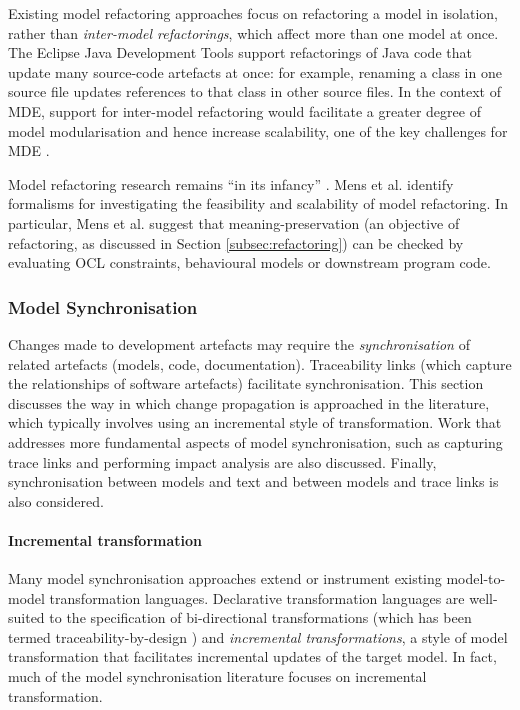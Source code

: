  
Existing model refactoring approaches focus on refactoring a model in isolation, rather than \emph{inter-model refactorings}, which affect more than one model at once. The Eclipse Java Development Tools support refactorings of Java code that update many source-code artefacts at once: for example, renaming a class in one source file updates references to that class in other source files. In \cc the context of MDE, support for inter-model refactoring would facilitate a greater degree of model modularisation and hence increase scalability, one of the key challenges for MDE \cite{kolovos08scalability}.

Model \cc refactoring research remains ``in its infancy'' \cite{mens07modelrefactoring}. Mens et al. identify formalisms for investigating the feasibility and scalability of model refactoring. In particular, Mens et al. suggest that meaning-preservation (an objective of refactoring, as discussed in Section \ref{subsec:refactoring}) can be checked by evaluating OCL constraints, behavioural models or downstream program code.


\subsubsection{Model Synchronisation}
\label{subsubsec:model_synch}
Changes made to development artefacts may require the \emph{synchronisation} of related artefacts (models, code, documentation). Traceability links (which capture the relationships of software artefacts) facilitate synchronisation. This section discusses the way in which change propagation is approached in the literature, which typically involves using an incremental style of transformation. Work that addresses more fundamental aspects of model synchronisation, such as capturing trace links and performing impact analysis are also discussed. Finally, synchronisation between models and text and between models and trace links is also considered.

\paragraph{Incremental transformation}
Many model synchronisation approaches extend or instrument existing model-to-model transformation languages. Declarative transformation languages are well-suited to the specification of bi-direct\-io\-nal transformations (which has been termed traceability-by-design \cite{fritzsche08tracing}) and \emph{incremental transformations}, a style of model transformation that facilitates incremental updates of the target model. In fact, much of the model synchronisation literature focuses on incremental transformation. 

